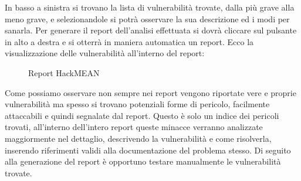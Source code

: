 In basso a sinistra si trovano la lista di vulnerabilità trovate, dalla più grave alla meno grave, e selezionandole si potrà osservare la sua descrizione ed i modi per sanarla.
Per generare il report dell’analisi effettuata si dovrà cliccare sul pulsante in alto a destra e si otterrà in maniera automatica un report. 
Ecco la visualizzazione delle vulnerabilità all’interno del report:

\begin{figure}[H]
    \caption{Report HackMEAN }
    \label{fig:reportHackMEAN}
\end{figure}

Come possiamo osservare non sempre nei report vengono riportate vere e proprie vulnerabilità ma spesso si trovano potenziali forme di pericolo, facilmente attaccabili e quindi segnalate dal report.
Questo è solo un indice dei pericoli trovati, all’interno dell’intero report queste minacce verranno analizzate maggiormente nel dettaglio, descrivendo la vulnerabilità e come risolverla, inserendo riferimenti validi alla documentazione del problema stesso.
Di seguito alla generazione del report è opportuno testare manualmente le vulnerabilità trovate. 


